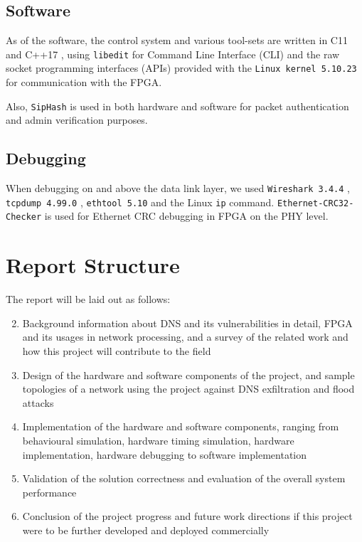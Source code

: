 \documentclass[a4paper]{report}
\newcommand{\proglang}{\textsf}
\newcommand{\code}{\texttt}
\begin{document}
\subsection{Software}
\label{section:introduction-tools-software}

As of the software, the control system and various tool-sets are written in \proglang{C11} \cite{iso-c} and \proglang{C++17} \cite{iso-cc}, using \code{libedit} \cite{thrysoee-2004} for Command Line Interface (CLI) and the raw socket programming interfaces (APIs) provided with the \code{Linux kernel 5.10.23} \cite{kroah-hartman-2021} for communication with the FPGA.

Also, \code{SipHash} \cite{aumasson-bernstein-2012} is used in both hardware and software for packet authentication and admin verification purposes.

\subsection{Debugging}
\label{section:introduction-tools-debugging}

When debugging on and above the data link layer, we used \code{Wireshark 3.4.4} \cite{wireshark-2021}, \code{tcpdump 4.99.0}
 \cite{tcpdump-2020}, \code{ethtool 5.10} \cite{kroah-hartman-2021} and the Linux \code{ip} command. \code{Ethernet-CRC32-Checker} \cite{jwbensley-2020} is used for Ethernet CRC debugging in FPGA on the PHY level.

\section{Report Structure}
The report will be laid out as follows:

\begin{enumerate}[leftmargin=*, label=Chapter \arabic* - ]
\setcounter{enumi}{1}
\item Background information about DNS and its vulnerabilities in detail, FPGA and its usages in network processing, and a survey of the related work and how this project will contribute to the field
\item Design of the hardware and software components of the project, and sample topologies of a network using the project against DNS exfiltration and flood attacks
\item Implementation of the hardware and software components, ranging from behavioural simulation, hardware timing simulation, hardware implementation, hardware debugging to software implementation
\item Validation of the solution correctness and evaluation of the overall system performance
\item Conclusion of the project progress and future work directions if this project were to be further developed and deployed commercially
\end{enumerate}
\end{document}
